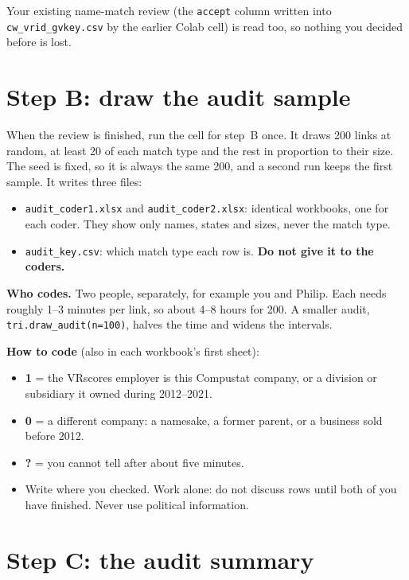 \documentclass[11pt,a4paper]{article}
\newcommand{\file}[1]{\texttt{#1}}
\begin{document}
Your existing name-match review (the \texttt{accept} column written into \file{cw\_vrid\_gvkey.csv} by the earlier Colab cell) is read too, so nothing you decided before is lost.

\section{Step B: draw the audit sample}\label{sec:audit}

When the review is finished, run the cell for step~B once. It draws 200 links at random, at least 20 of each match type and the rest in proportion to their size. The seed is fixed, so it is always the same 200, and a second run keeps the first sample. It writes three files:
\begin{itemize}\setlength{\itemsep}{2pt}
\item \file{audit\_coder1.xlsx} and \file{audit\_coder2.xlsx}: identical workbooks, one for each coder. They show only names, states and sizes, never the match type.
\item \file{audit\_key.csv}: which match type each row is. \textbf{Do not give it to the coders.}
\end{itemize}

\textbf{Who codes.} Two people, separately, for example you and Philip. Each needs roughly 1--3 minutes per link, so about 4--8 hours for 200. A smaller audit, \texttt{tri.draw\_audit(n=100)}, halves the time and widens the intervals.

\textbf{How to code} (also in each workbook's first sheet):
\begin{itemize}\setlength{\itemsep}{2pt}
\item \textbf{1} = the VRscores employer is this Compustat company, or a division or subsidiary it owned during 2012--2021.
\item \textbf{0} = a different company: a namesake, a former parent, or a business sold before 2012.
\item \textbf{?} = you cannot tell after about five minutes.
\item Write where you checked. Work alone: do not discuss rows until both of you have finished. Never use political information.
\end{itemize}

\section{Step C: the audit summary}\label{sec:summary}
\end{document}
